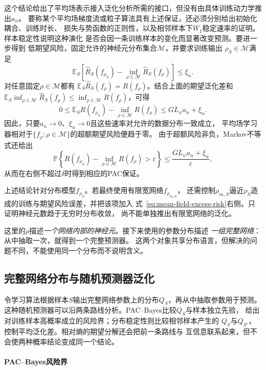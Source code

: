 这个结论给出了平均场表示接入泛化分析所需的接口，但没有由具体训练动力学推出$a_n$。
要称某个平均场梯度流或粒子算法具有上述保证，还必须分别给出初始化耦合、训练时长、
损失与势函数的正则性，以及相邻样本下$W_1$稳定速率的证明。样本稳定性说明这种演化
是否会因一条训练样本的变化而显著改变预测。要进一步得到
低期望风险，固定允许的神经元分布集合$\mathcal M$，并要求训练输出
$\rho_S\in\mathcal M$满足
\[
 \mathbb E_S\left[
   \hat R_S(f_{\rho_S})
   -\inf_{\rho\in\mathcal M}\hat R_S(f_\rho)
 \right]\leq\xi_n.
\]
对任意固定$\rho\in\mathcal M$都有
$\mathbb E_S\hat R_S(f_\rho)=R(f_\rho)$。结合上面的期望泛化差和
$\mathbb E_S\inf_{\rho\in\mathcal M}\hat R_S(f_\rho)
\leq\inf_{\rho\in\mathcal M}R(f_\rho)$，可得
\begin{equation}
 0\leq
 \mathbb E_S R(f_{\rho_S})
 -\inf_{\rho\in\mathcal M}R(f_\rho)
 \leq G L_\psi a_n+\xi_n.
 \label{eq:mean-field-excess-risk}
\end{equation}
因此，只要$a_n\to0$、$\xi_n\to0$且这些速率对允许的数据分布一致成立，
平均场学习器相对于$\{f_\rho:\rho\in\mathcal M\}$的超额期望风险便趋于零。
由于超额风险非负，Markov不等式还给出
\[
 \mathbb P\left\{
 R(f_{\rho_S})-\inf_{\rho\in\mathcal M}R(f_\rho)>\varepsilon
 \right\}
 \leq\frac{G L_\psi a_n+\xi_n}{\varepsilon},
\]
从而在右侧不超过$\delta$时得到相应的PAC保证。

上述结论针对分布模型$f_{\rho_S}$。若最终使用有限宽网络$f_{\rho_{m,S}}$，
还需控制$\rho_{m,S}$逼近$\rho_S$造成的训练与期望风险误差，并把该项加入
式~\eqref{eq:mean-field-excess-risk}右侧。只证明神经元数趋于无穷时分布收敛，
尚不能单独推出有限宽网络的泛化。

这里的$\rho$描述\emph{一个网络内部的神经元}。接下来使用的参数分布描述
\emph{一组完整网络}：从中抽取一次，就得到一个完整预测器。
这两个对象共享分布语言，但解决的问题不同，不能使用同一个分布而不说明含义。

\subsection{完整网络分布与随机预测器泛化}
\label{sec:pac-bayes}

令学习算法根据样本$S$输出完整网络参数上的分布$Q_S$，再从中抽取参数用于预测。
这种随机预测器可以沿两条路线分析。PAC--Bayes比较$Q_S$与样本独立先验，
给出对训练样本高概率成立的风险界；分布稳定性则比较相邻样本产生的
$Q_S$与$Q_{S'}$，控制平均泛化差。相对熵的期望分解还会把前一条路线与
互信息联系起来，但不会使两种概率结论变成同一个结论。

\paragraph{PAC--Bayes风险界}

